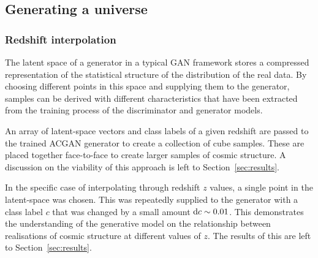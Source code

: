 \documentclass[twocolumn]{article}
\numberwithin{equation}{section}
\begin{document}
\subsection{Generating a universe}


\subsubsection{Redshift interpolation}\label{methods:z_interp}
The latent space of a generator in a typical GAN framework stores a compressed representation of the statistical structure
of the distribution of the real data. By choosing different points in this space and supplying them to the generator, 
samples can be derived with different characteristics that have been extracted from the training process of the 
discriminator and generator models.

An array of latent-space vectors and class labels of a given redshift are passed to the trained ACGAN generator to create
a collection of cube samples. These are placed together face-to-face to create larger samples of cosmic structure. A 
discussion on the viability of this approach is left to Section~\ref{sec:results}.

In the specific case of interpolating through redshift $z$ values, a single point in the latent-space was chosen. This was 
repeatedly supplied to the generator with a class label $c$ that was changed by a small amount $\textup{d}c \sim 0.01$. 
This demonstrates the understanding of the generative model on the relationship between realisations of cosmic structure 
at different values of $z$. The results of this are left to Section~\ref{sec:results}.

\end{document}
